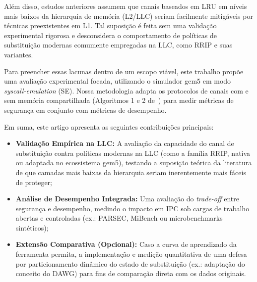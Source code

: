 \documentclass[12pt]{article}
\begin{document}
Além disso, estudos anteriores assumem que canais baseados em LRU em níveis mais baixos da hierarquia de memória (L2/LLC) seriam facilmente mitigáveis por técnicas preexistentes em L1. Tal suposição é feita sem uma validação experimental rigorosa e desconsidera o comportamento de políticas de substituição modernas comumente empregadas na LLC, como RRIP e suas variantes.

Para preencher essas lacunas dentro de um escopo viável, este trabalho propõe uma avaliação experimental focada, utilizando o simulador gem5 em modo \textit{syscall-emulation} (SE). Nossa metodologia adapta os protocolos de canais com e sem memória compartilhada (Algoritmos 1 e 2 de~\cite{9354935}) para medir métricas de segurança em conjunto com métricas de desempenho. 

Em suma, este artigo apresenta as seguintes contribuições principais:
\begin{itemize}
    \item \textbf{Validação Empírica na LLC:} A avaliação da capacidade do canal de substituição contra políticas modernas na LLC (como a família RRIP, nativa ou adaptada no ecossistema gem5), testando a suposição teórica da literatura de que camadas mais baixas da hierarquia seriam inerentemente mais fáceis de proteger;
    \item \textbf{Análise de Desempenho Integrada:} Uma avaliação do \textit{trade-off} entre segurança e desempenho, medindo o impacto em IPC sob cargas de trabalho abertas e controladas (ex.: PARSEC, MiBench ou microbenchmarks sintéticos);
    \item \textbf{Extensão Comparativa (Opcional):} Caso a curva de aprendizado da ferramenta permita, a implementação e medição quantitativa de uma defesa por particionamento dinâmico do estado de substituição (ex.: adaptação do conceito do DAWG) para fins de comparação direta com os dados originais.
\end{itemize}



\newpage


\end{document}
